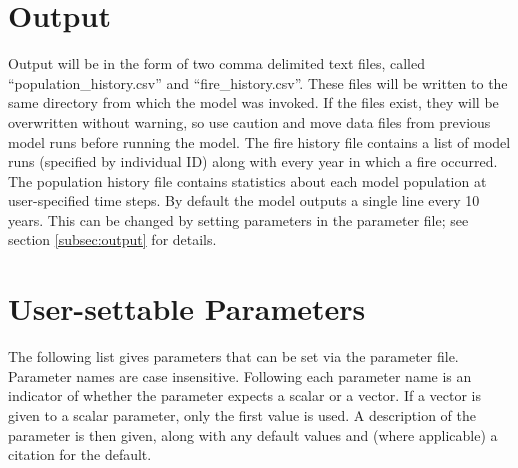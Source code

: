 \documentclass[12pt, english]{article}
\begin{document}
\section{Output}
Output will be in the form of two comma delimited text files, called ``population\_history.csv'' and ``fire\_history.csv''. These files will be written to the same directory from which the model was invoked. If the files exist, they will be overwritten without warning, so use caution and move data files from previous model runs before running the model. The fire history file contains a list of model runs (specified by individual ID) along with every year in which a fire occurred. The population history file contains statistics about each model population at user-specified time steps. By default the model outputs a single line every 10 years. This can be changed by setting parameters in the parameter file; see section \ref{subsec:output} for details.

\section{User-settable Parameters}
\label{sec:user-set}
The following list gives parameters that can be set via the parameter file. Parameter names are case insensitive. Following each parameter name is an indicator of whether the parameter expects a scalar or a vector. If a vector is given to a scalar parameter, only the first value is used. A description of the parameter is then given, along with any default values and (where applicable) a citation for the default.
\end{document}
